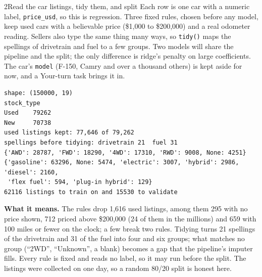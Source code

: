 
\begin{labquestion}{2}{Read the car listings, tidy them, and split}
Each row is one car with a numeric label, \texttt{price\_usd}, so this is regression. Three fixed rules, chosen before any model, keep used cars with a believable price (\$1,000 to \$200,000) and a real odometer reading. Sellers also type the same thing many ways, so \texttt{tidy()} maps the spellings of drivetrain and fuel to a few groups. Two models will share the pipeline and the split; the only difference is ridge's penalty on large coefficients. The car's \texttt{model} (F-150, Camry and over a thousand others) is kept aside for now, and a Your-turn task brings it in.
\end{labquestion}
\begin{labanswer}

\begin{refoutput}
\begin{lstlisting}[style=utpterminal]
shape: (150000, 19)
stock_type
Used    79262
New     70738
used listings kept: 77,646 of 79,262
spellings before tidying: drivetrain 21  fuel 31
{'AWD': 28787, 'FWD': 18290, '4WD': 17310, 'RWD': 9008, None: 4251}
{'gasoline': 63296, None: 5474, 'electric': 3007, 'hybrid': 2986, 'diesel': 2160,
 'flex fuel': 594, 'plug-in hybrid': 129}
62116 listings to train on and 15530 to validate
\end{lstlisting}
\end{refoutput}

\textbf{What it means.} The rules drop 1,616 used listings, among them 295 with no price shown, 712 priced above \$200,000 (24 of them in the millions) and 659 with 100 miles or fewer on the clock; a few break two rules. Tidying turns 21 spellings of the drivetrain and 31 of the fuel into four and six groups; what matches no group (``2WD'', ``Unknown'', a blank) becomes a gap that the pipeline's imputer fills. Every rule is fixed and reads no label, so it may run before the split. The listings were collected on one day, so a random 80/20 split is honest here.
\end{labanswer}

